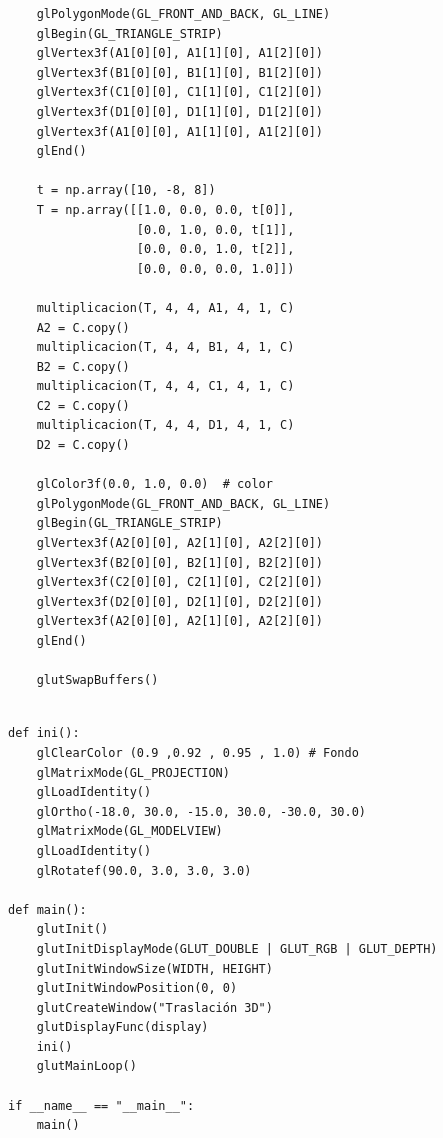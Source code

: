 \documentclass[a4paper]{article}
\begin{document}
\begin{center}
\begin{mycodeboxl}
\begin{lstlisting}
    glPolygonMode(GL_FRONT_AND_BACK, GL_LINE)
    glBegin(GL_TRIANGLE_STRIP)
    glVertex3f(A1[0][0], A1[1][0], A1[2][0])
    glVertex3f(B1[0][0], B1[1][0], B1[2][0])
    glVertex3f(C1[0][0], C1[1][0], C1[2][0])
    glVertex3f(D1[0][0], D1[1][0], D1[2][0])
    glVertex3f(A1[0][0], A1[1][0], A1[2][0])
    glEnd()

    t = np.array([10, -8, 8])
    T = np.array([[1.0, 0.0, 0.0, t[0]],
                  [0.0, 1.0, 0.0, t[1]],
                  [0.0, 0.0, 1.0, t[2]],
                  [0.0, 0.0, 0.0, 1.0]])

    multiplicacion(T, 4, 4, A1, 4, 1, C)
    A2 = C.copy()
    multiplicacion(T, 4, 4, B1, 4, 1, C)
    B2 = C.copy()
    multiplicacion(T, 4, 4, C1, 4, 1, C)
    C2 = C.copy()
    multiplicacion(T, 4, 4, D1, 4, 1, C)
    D2 = C.copy()

    glColor3f(0.0, 1.0, 0.0)  # color 
    glPolygonMode(GL_FRONT_AND_BACK, GL_LINE)
    glBegin(GL_TRIANGLE_STRIP)
    glVertex3f(A2[0][0], A2[1][0], A2[2][0])
    glVertex3f(B2[0][0], B2[1][0], B2[2][0])
    glVertex3f(C2[0][0], C2[1][0], C2[2][0])
    glVertex3f(D2[0][0], D2[1][0], D2[2][0])
    glVertex3f(A2[0][0], A2[1][0], A2[2][0])
    glEnd()

    glutSwapBuffers()
\end{lstlisting}
\end{mycodeboxl}
\end{center}

\begin{center}
\begin{mycodebox}
\begin{lstlisting}

def ini():
    glClearColor (0.9 ,0.92 , 0.95 , 1.0) # Fondo
    glMatrixMode(GL_PROJECTION)
    glLoadIdentity()
    glOrtho(-18.0, 30.0, -15.0, 30.0, -30.0, 30.0)
    glMatrixMode(GL_MODELVIEW)
    glLoadIdentity()
    glRotatef(90.0, 3.0, 3.0, 3.0)

def main():
    glutInit()
    glutInitDisplayMode(GLUT_DOUBLE | GLUT_RGB | GLUT_DEPTH)
    glutInitWindowSize(WIDTH, HEIGHT)
    glutInitWindowPosition(0, 0)
    glutCreateWindow("Traslación 3D")
    glutDisplayFunc(display)
    ini()
    glutMainLoop()

if __name__ == "__main__":
    main()
\end{lstlisting}
\end{mycodebox}
\end{center}
\end{document}
